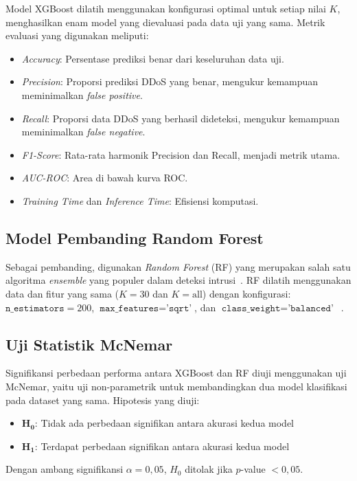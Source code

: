 \documentclass[conference,a4paper]{IEEEtran}
\begin{document}
Model XGBoost dilatih menggunakan konfigurasi optimal untuk setiap nilai $K$, menghasilkan enam model yang dievaluasi pada data uji yang sama. Metrik evaluasi yang digunakan meliputi:
\begin{itemize}
    \item \textit{Accuracy}: Persentase prediksi benar dari keseluruhan data uji.
    \item \textit{Precision}: Proporsi prediksi DDoS yang benar, mengukur kemampuan meminimalkan \textit{false positive}.
    \item \textit{Recall}: Proporsi data DDoS yang berhasil dideteksi, mengukur kemampuan meminimalkan \textit{false negative}.
    \item \textit{F1-Score}: Rata-rata harmonik Precision dan Recall, menjadi metrik utama.
    \item \textit{AUC-ROC}: Area di bawah kurva ROC.
    \item \textit{Training Time} dan \textit{Inference Time}: Efisiensi komputasi.
\end{itemize}

\subsection{Model Pembanding Random Forest}

Sebagai pembanding, digunakan \textit{Random Forest} (RF) yang merupakan salah satu algoritma \textit{ensemble} yang populer dalam deteksi intrusi~\cite{ref_ullah2020}. RF dilatih menggunakan data dan fitur yang sama ($K=30$ dan $K=\text{all}$) dengan konfigurasi: $\texttt{n\_estimators} = 200$, $\texttt{max\_features} = \texttt{'sqrt'}$, dan $\texttt{class\_weight} = \texttt{'balanced'}$~\cite{ref_ullah2020}.

\subsection{Uji Statistik McNemar}

Signifikansi perbedaan performa antara XGBoost dan RF diuji menggunakan uji McNemar, yaitu uji non-parametrik untuk membandingkan dua model klasifikasi pada dataset yang sama. Hipotesis yang diuji:
\begin{itemize}
    \item $\mathbf{H_0}$: Tidak ada perbedaan signifikan antara akurasi kedua model
    \item $\mathbf{H_1}$: Terdapat perbedaan signifikan antara akurasi kedua model
\end{itemize}
Dengan ambang signifikansi $\alpha = 0{,}05$, $H_0$ ditolak jika $p$-value $< 0{,}05$.
\end{document}
